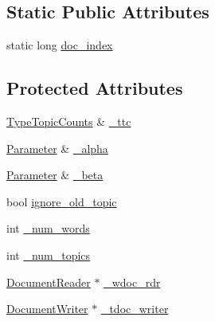 \subsection*{Static Public Attributes}
\begin{DoxyCompactItemize}
\item 
static long \hyperlink{class_unigram___model___tester_a1c5f61eac028445bec986e4f039351a9}{doc\_\-index}
\end{DoxyCompactItemize}
\subsection*{Protected Attributes}
\begin{DoxyCompactItemize}
\item 
\hyperlink{class_type_topic_counts}{TypeTopicCounts} \& \hyperlink{class_unigram___model___tester_ab57a6e0b5a58a5d1b6e39d4ab800ca98}{\_\-ttc}
\item 
\hyperlink{struct_parameter}{Parameter} \& \hyperlink{class_unigram___model___tester_a80beff68624c3fc783c5f6771793861f}{\_\-alpha}
\item 
\hyperlink{struct_parameter}{Parameter} \& \hyperlink{class_unigram___model___tester_a5aafc151a4c9d0ed2db3061b559266f0}{\_\-beta}
\item 
bool \hyperlink{class_unigram___model___tester_ae83a2ed8e687c16a8d495e5004555444}{ignore\_\-old\_\-topic}
\item 
int \hyperlink{class_unigram___model___tester_a5e7c01034e841646de2c1748d39fd91b}{\_\-num\_\-words}
\item 
int \hyperlink{class_unigram___model___tester_ad8767c95bfebb76966c949e4547fe3dc}{\_\-num\_\-topics}
\item 
\hyperlink{class_document_reader}{DocumentReader} $\ast$ \hyperlink{class_unigram___model___tester_a77808c2107a7d92a6163545f08d45829}{\_\-wdoc\_\-rdr}
\item 
\hyperlink{class_document_writer}{DocumentWriter} $\ast$ \hyperlink{class_unigram___model___tester_abf32d713f43dd44a5db735b83eaf2239}{\_\-tdoc\_\-writer}
\end{DoxyCompactItemize}


